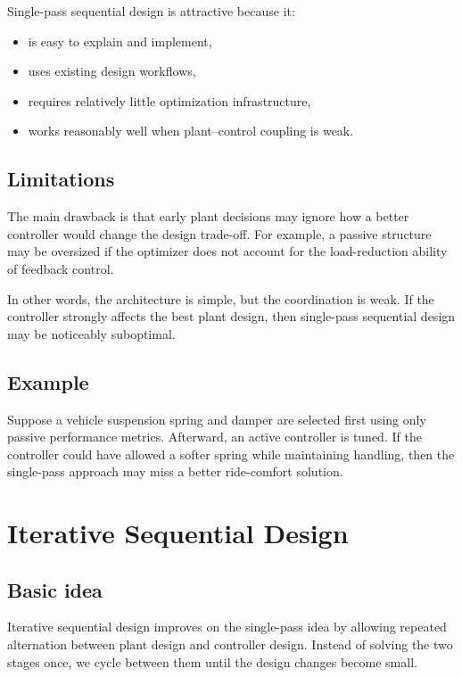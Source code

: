 \documentclass[11pt]{article}
\begin{document}
Single-pass sequential design is attractive because it:
\begin{itemize}[leftmargin=1.4em]
  \item is easy to explain and implement,
  \item uses existing design workflows,
  \item requires relatively little optimization infrastructure,
  \item works reasonably well when plant--control coupling is weak.
\end{itemize}

\subsection{Limitations}

The main drawback is that early plant decisions may ignore how a better controller would change the design trade-off. For example, a passive structure may be oversized if the optimizer does not account for the load-reduction ability of feedback control.

In other words, the architecture is simple, but the coordination is weak. If the controller strongly affects the best plant design, then single-pass sequential design may be noticeably suboptimal.

\subsection{Example}

Suppose a vehicle suspension spring and damper are selected first using only passive performance metrics. Afterward, an active controller is tuned. If the controller could have allowed a softer spring while maintaining handling, then the single-pass approach may miss a better ride-comfort solution.

\section{Iterative Sequential Design}

\subsection{Basic idea}

Iterative sequential design improves on the single-pass idea by allowing repeated alternation between plant design and controller design. Instead of solving the two stages once, we cycle between them until the design changes become small.
\end{document}
